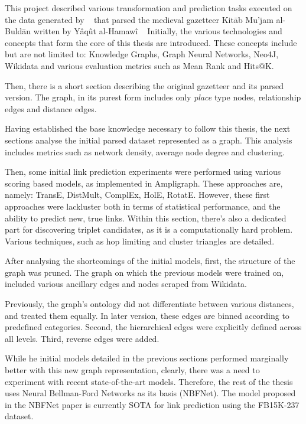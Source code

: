This project described various transformation and prediction tasks executed on the data generated by ~\cite{YaqutRB} that parsed the medieval gazetteer Kitāb Mu'jam al-Buldān written by Yâqût al-Hamawî ~\cite{Yaqut}
Initially, the various technologies and concepts that form the core of this thesis are introduced.
These concepts include but are not limited to: Knowledge Graphs, Graph Neural Networks, Neo4J, Wikidata and various
evaluation metrics such as Mean Rank and Hits@K.

Then, there is a short section describing the original gazetteer and its parsed version.
The graph, in its purest form includes only \textit{place} type nodes, relationship edges and distance edges.

Having established the base knowledge necessary to follow this thesis, the next sections analyse the initial parsed dataset represented as a graph.
This analysis includes metrics such as network density, average node degree and clustering.

Then, some initial link prediction experiments were performed using various scoring based models, as implemented in Ampligraph.
These approaches are, namely: TransE, DistMult, ComplEx, HolE, RotatE. However, these first approaches were lackluster
both in terms of statistical performance, and the ability to predict new, true links.
Within this section, there's also a dedicated part for discovering triplet candidates, as it is a computationally hard problem.
Various techniques, such as hop limiting and cluster triangles are detailed.

After analysing the shortcomings of the initial models, first, the structure of the graph was pruned.
The graph on which the previous models were trained on, included various ancillary edges and nodes scraped from Wikidata.

Previously, the graph's ontology did not differentiate between various distances, and treated them equally.
In later version, these edges are binned according to predefined categories.
Second, the hierarchical edges were explicitly defined across all levels.
Third, reverse edges were added.

While he initial models detailed in the previous sections performed marginally better with this new graph representation,
clearly, there was a need to experiment with recent state-of-the-art models.
Therefore, the rest of the thesis uses Neural Bellman-Ford Networks as its basis (NBFNet).
The model proposed in the NBFNet paper is currently SOTA for link prediction using the FB15K-237 dataset.

